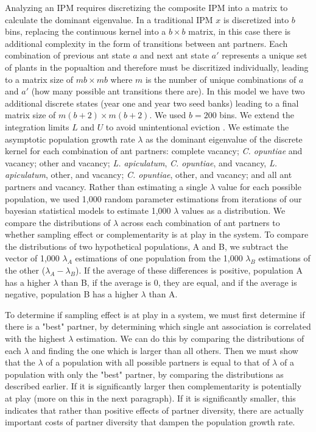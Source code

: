 \documentclass[11pt]{article}
\begin{document}
Analyzing an IPM requires discretizing the composite IPM into a matrix to calculate the dominant eigenvalue. 
In a traditional IPM $x$ is discretized into $b$ bins, replacing the continuous kernel into a $b \times b$ matrix, in this case there is additional complexity in the form of transitions between ant partners. 
Each combination of previous ant state $a$ and next ant state $a'$ represents a unique set of plants in the popualtion and therefore must be discritized individually, leading to a matrix size of $m b \times m b$ where $m$ is the number of unique combinations of $a$ and $a'$ (how many possible ant transitions there are). 
In this model we have two additional discrete states (year one and year two seed banks) leading to a final matrix size of $m(b+2) \times m(b+2)$.
We used $b = 200$ bins.
We extend the integration limits $L$ and $U$ to avoid unintentional eviction \cite{Williams2012}.
We estimate the asymptotic population growth rate $\lambda$ as the dominant eigenvalue of the discrete kernel for each combination of ant partners: complete vacancy; \textit{C. opuntiae} and vacancy; other and vacancy; \textit{L. apiculatum}, \textit{C. opuntiae}, and vacancy, \textit{L. apiculatum}, other, and vacancy; \textit{C. opuntiae}, other, and vacancy; and all ant partners and vacancy.
Rather than estimating a single $\lambda$ value for each possible population, we used 1,000 random parameter estimations from iterations of our bayesian statistical models to estimate 1,000 $\lambda$ values as a distribution.
We compare the distributions of $\lambda$ across each combination of ant partners to whether sampling effect or complementarity is at play in the system.
To compare the distributions of two hypothetical populations, A and B, we subtract the vector of 1,000 $\lambda_A$ estimations of one population from the 1,000 $\lambda_B$ estimations of the other ($\lambda_A - \lambda_B$).
If the average of these differences is positive, population A has a higher $\lambda$ than B, if the average is 0, they are equal, and if the average is negative, population B has a higher $\lambda$ than A. 

To determine if sampling effect is at play in a system, we must first determine if there is a "best" partner, by determining which single ant association is correlated with the highest $\lambda$ estimation.
We can do this by comparing the distributions of each $\lambda$ and finding the one which is larger than all others.
Then we must show that the $\lambda$ of a population with all possible partners is equal to that of $\lambda$ of a population with only the "best" partner, by comparing the distributions as described earlier.
If it is significantly larger then complementarity is potentially at play (more on this in the next paragraph).
If it is significantly smaller, this indicates that rather than positive effects of partner diversity, there are actually important costs of partner diversity that dampen the population growth rate.
\end{document}
